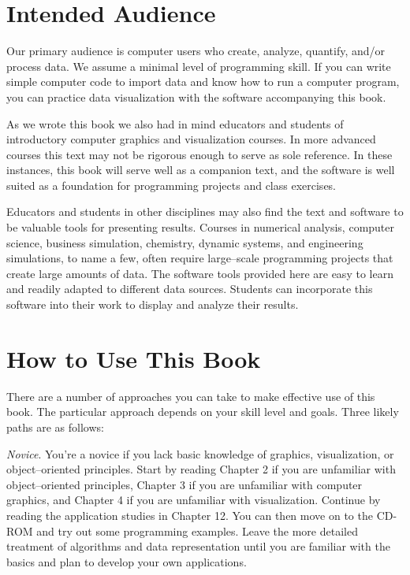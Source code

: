 \section{Intended Audience}

Our primary audience is computer users who create, analyze, quantify, and/or process data. We assume a minimal level of programming skill. If you can write simple computer code to import data and know how to run a computer program, you can practice data visualization with the software accompanying this book.

As we wrote this book we also had in mind educators and students of introductory computer graphics and visualization courses. In more advanced courses this text may not be rigorous enough to serve as sole reference. In these instances, this book will serve well as a companion text, and the software is well suited as a foundation for programming projects and class exercises.

Educators and students in other disciplines may also find the text and software to be valuable tools for presenting results. Courses in numerical analysis, computer science, business simulation, chemistry, dynamic systems, and engineering simulations, to name a few, often require large--scale programming projects that create large amounts of data. The software tools provided here are easy to learn and readily adapted to different data sources. Students can incorporate this software into their work to display and analyze their
results.

\section{How to Use This Book}

There are a number of approaches you can take to make effective use of this book. The particular approach depends on your skill level and goals. Three likely paths are as follows:

\emph{Novice}. You're a novice if you lack basic knowledge of graphics, visualization, or object--oriented principles. Start by reading Chapter 2 if you are unfamiliar with object--oriented principles, Chapter 3 if you are unfamiliar with computer graphics, and Chapter 4 if you are unfamiliar with visualization. Continue by reading the application studies in Chapter 12. You can then move on to the CD-ROM and try out some programming examples. Leave the more detailed treatment of algorithms and data representation until you are familiar with the basics and plan to develop your own applications.

